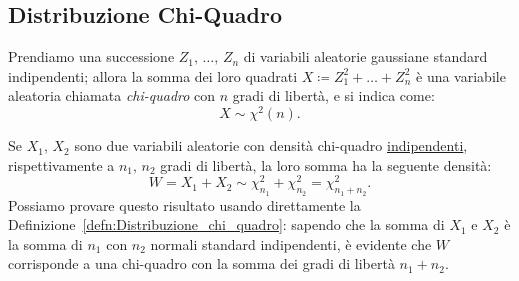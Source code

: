         \subsection{Distribuzione Chi-Quadro}
            \begin{defn}\label{defn:Distribuzione_chi_quadro}
                Prendiamo una successione $Z_1,\, \ldots,\, Z_{n}$ di variabili aleatorie gaussiane standard indipendenti; allora la somma dei loro quadrati $X \coloneqq Z^2_1 + \ldots + Z^2_{n}$ è una variabile aleatoria chiamata \textit{chi-quadro} con $n$ gradi di libertà, e si indica come: \[
                    X \sim \chi^2(n)
                .\]
            \end{defn}
            \begin{obsv}[Riproducibilità]
                Se $X_1,\,X_2$ sono due variabili aleatorie con densità chi-quadro \underline{indipendenti}, rispettivamente a $n_1,\,n_2$ gradi di libertà, la loro somma ha la seguente densità: \[
                    W = X_1 + X_2 \sim \chi^2_{n_1} + \chi^2_{n_2} = \chi^2_{n_1+n_2}
                .\] Possiamo provare questo risultato usando direttamente la Definizione~\ref{defn:Distribuzione_chi_quadro}: sapendo che la somma di $X_1$ e $X_2$ è la somma di $n_1$ con $n_2$ normali standard indipendenti, è evidente che $W$ corrisponde a una chi-quadro con la somma dei gradi di libertà $n_1+n_2$.
            \end{obsv}
